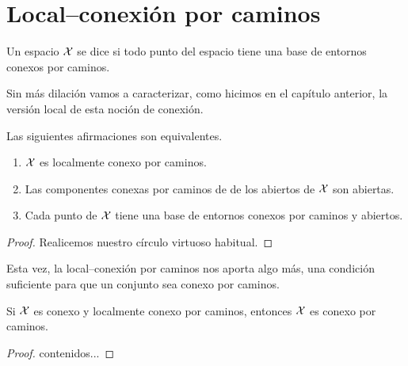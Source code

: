 \section{Local--conexión por caminos}
\begin{defi}
	Un espacio $\mathcal{X}$ se dice  si todo punto del espacio tiene una base de entornos conexos por caminos.
\end{defi}
Sin más dilación vamos a caracterizar, como hicimos en el capítulo anterior, la versión local de esta noción de conexión.
\begin{lem}[Caracterización]
	Las siguientes afirmaciones son equivalentes.
	\begin{enumerate}
		\item $\mathcal{X}$ es localmente conexo por caminos.
		\item Las componentes conexas por caminos de de los abiertos de $\mathcal{X}$ son abiertas.
		\item Cada punto de $\mathcal{X}$ tiene una base de entornos conexos por caminos y abiertos.
	\end{enumerate}
\end{lem}
\begin{proof} Realicemos nuestro círculo virtuoso habitual.
\end{proof}
Esta vez, la local--conexión por caminos nos aporta algo más, una condición suficiente para que un conjunto sea conexo por caminos.
\begin{prop}
	Si $\mathcal{X}$ es conexo y localmente conexo por caminos, entonces $\mathcal{X}$ es conexo por caminos.
\end{prop}
\begin{proof}
	contenidos...
\end{proof}
